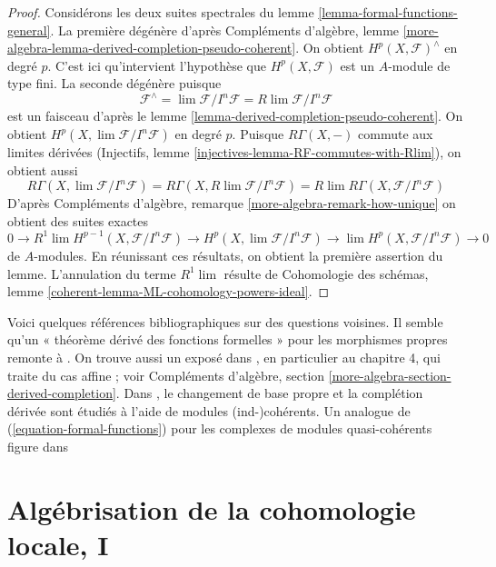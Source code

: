 \begin{proof}
Considérons les deux suites spectrales du
lemme \ref{lemma-formal-functions-general}.
La première dégénère d'après Compléments d'algèbre, lemme
\ref{more-algebra-lemma-derived-completion-pseudo-coherent}.
On obtient $H^p(X, \mathcal{F})^\wedge$ en degré $p$.
C'est ici qu'intervient l'hypothèse que $H^p(X, \mathcal{F})$ est
un $A$-module de type fini. La seconde dégénère puisque
$$
\mathcal{F}^\wedge = \lim \mathcal{F}/I^n\mathcal{F} =
R\lim \mathcal{F}/I^n\mathcal{F}
$$
est un faisceau d'après le lemme \ref{lemma-derived-completion-pseudo-coherent}.
On obtient $H^p(X, \lim \mathcal{F}/I^n\mathcal{F})$ en degré $p$.
Puisque $R\Gamma(X, -)$ commute aux limites dérivées
(Injectifs, lemme \ref{injectives-lemma-RF-commutes-with-Rlim}),
on obtient aussi
$$
R\Gamma(X, \lim \mathcal{F}/I^n\mathcal{F}) =
R\Gamma(X, R\lim \mathcal{F}/I^n\mathcal{F}) =
R\lim R\Gamma(X, \mathcal{F}/I^n\mathcal{F})
$$
D'après Compléments d'algèbre, remarque
\ref{more-algebra-remark-how-unique}
on obtient des suites exactes
$$
0 \to
R^1\lim H^{p - 1}(X, \mathcal{F}/I^n\mathcal{F}) \to
H^p(X, \lim \mathcal{F}/I^n\mathcal{F}) \to
\lim H^p(X, \mathcal{F}/I^n\mathcal{F}) \to 0
$$
de $A$-modules. En réunissant ces résultats, on obtient la première assertion du lemme.
L'annulation du terme $R^1\lim$ résulte de
Cohomologie des schémas, lemme \ref{coherent-lemma-ML-cohomology-powers-ideal}.
\end{proof}

\begin{remark}
\label{remark-references}
Voici quelques références bibliographiques sur des questions voisines.
Il semble qu'un « théorème dérivé des fonctions formelles » pour les morphismes propres
remonte à \cite[Theorem 6.3.1]{lurie-thesis}.
On trouve aussi un exposé dans \cite{dag12}, en particulier
au chapitre 4, qui traite du cas affine ; voir
Compléments d'algèbre, section \ref{more-algebra-section-derived-completion}.
Dans \cite[Section 2.9]{G-R}, le changement de base propre et la
complétion dérivée sont étudiés à l'aide de modules (ind-)cohérents.
Un analogue de (\ref{equation-formal-functions})
pour les complexes de modules quasi-cohérents figure dans
\cite[Theorem 6.5]{HL-P}
\end{remark}







\section{Algébrisation de la cohomologie locale, I}
\label{section-algebraization-sections-general}

